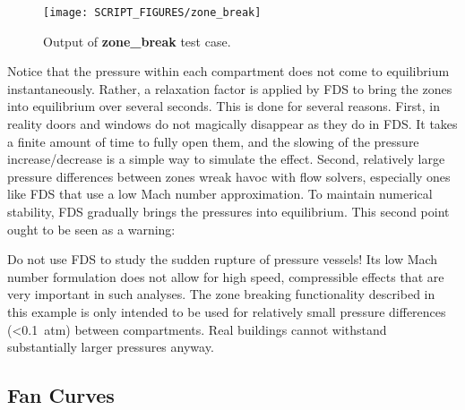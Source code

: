 \documentclass[11pt]{book}
\begin{document}
\begin{figure}[ht]
\begin{center}
\texttt{[image: SCRIPT\_FIGURES/zone\_break]}
\end{center}
\caption[Output of {\bf zone\_break} test case.]{Output of {\bf zone\_break} test case.}
\label{zone_break}
\end{figure}

\noindent
Notice that the pressure within each compartment does not come to equilibrium instantaneously. Rather, a relaxation factor is applied by FDS to bring the zones
into equilibrium over several seconds. This is done for several reasons. First, in reality doors and windows do not magically disappear as they do in FDS. It takes
a finite amount of time to fully open them, and the slowing of the pressure increase/decrease is a simple way to simulate the effect.
Second, relatively large pressure differences between zones wreak havoc with flow solvers, especially ones like FDS that
use a low Mach number approximation. To maintain numerical stability, FDS gradually brings the pressures into equilibrium. This second point ought to be seen as a warning:

\begin{warning}
\noindent Do not use FDS to study the sudden rupture of pressure vessels! Its low Mach number formulation does not allow for high speed, compressible effects that
are very important in such analyses. The zone breaking functionality described in this example is only intended to be used for relatively small pressure differences (<0.1~atm)
between compartments. Real buildings cannot withstand substantially larger pressures anyway.
\end{warning}



\subsection{Fan Curves}
\label{info:Fan_Curves}
\end{document}
